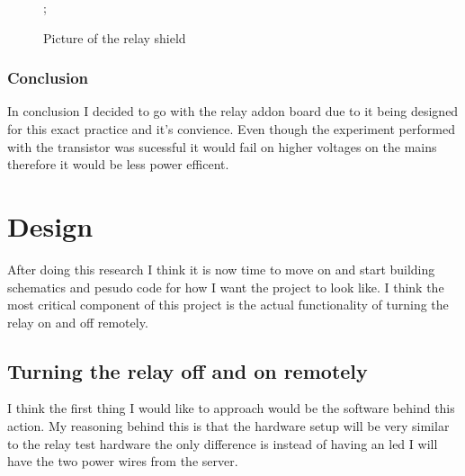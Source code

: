 \documentclass{article}
\begin{document}
\begin{figure}[H]
    \noindent{};
    \caption{Picture of the relay shield} \label{fig:relayShield}
\end{figure}

\subsubsection{Conclusion}
In conclusion I decided to go with the relay addon board due to it being designed for this exact practice and
it's convience. Even though the experiment performed with the transistor was sucessful it would fail on
higher voltages on the mains therefore it would be less power efficent.

\section{Design}

After doing this research I think it is now time to move on and start building schematics and pesudo code
for how I want the project to look like. I think the most critical component of this project is the
actual functionality of turning the relay on and off remotely.

\subsection{Turning the relay off and on remotely}
I think the first thing I would like to approach would be the software behind this action. My reasoning
behind this is that the hardware setup will be very similar to the relay test hardware the only difference
is instead of having an led I will have the two power wires from the server.
\end{document}
